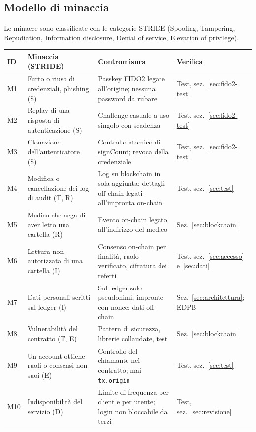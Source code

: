 \subsection{Modello di minaccia}\label{sec:minacce}
Le minacce sono classificate con le categorie STRIDE (Spoofing, Tampering, Repudiation, Information disclosure, Denial of service, Elevation of privilege).

\begin{table}[H]
\centering\footnotesize
\renewcommand{\arraystretch}{1.25}
\begin{tabular}{@{}l p{} p{} p{}@{}}
\toprule
ID & Minaccia (STRIDE) & Contromisura & Verifica\\
\midrule
M1 & Furto o riuso di credenziali, phishing (S) & Passkey FIDO2 legate all'origine; nessuna password da rubare & Test, sez.~\ref{sec:fido2-test}\\
M2 & Replay di una risposta di autenticazione (S) & Challenge casuale a uso singolo con scadenza & Test, sez.~\ref{sec:fido2-test}\\
M3 & Clonazione dell'autenticatore (S) & Controllo atomico di signCount; revoca della credenziale & Test, sez.~\ref{sec:fido2-test}\\
M4 & Modifica o cancellazione dei log di audit (T, R) & Log su blockchain in sola aggiunta; dettagli off-chain legati all'impronta on-chain & Test, sez.~\ref{sec:test}\\
M5 & Medico che nega di aver letto una cartella (R) & Evento on-chain legato all'indirizzo del medico & Sez.~\ref{sec:blockchain}\\
M6 & Lettura non autorizzata di una cartella (I) & Consenso on-chain per finalità, ruolo verificato, cifratura dei referti & Test, sez.~\ref{sec:accesso} e~\ref{sec:dati}\\
M7 & Dati personali scritti sul ledger (I) & Sul ledger solo pseudonimi, impronte con nonce; dati off-chain & Sez.~\ref{sec:architettura}; EDPB\cite{edpb-blockchain}\\
M8 & Vulnerabilità del contratto (T, E) & Pattern di sicurezza, librerie collaudate, test & Sez.~\ref{sec:blockchain}\\
M9 & Un account ottiene ruoli o consensi non suoi (E) & Controllo del chiamante nel contratto; mai \texttt{tx.origin} & Test, sez.~\ref{sec:test}\\
M10 & Indisponibilità del servizio (D) & Limite di frequenza per client e per utente; login non bloccabile da terzi & Test, sez.~\ref{sec:revisione}\\

\end{tabular}
\end{table}
